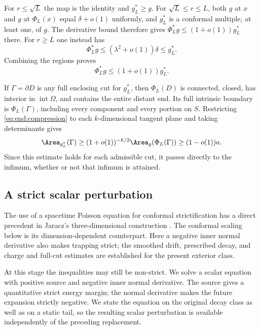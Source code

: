 For $r\le\sqrt L$ the map is the identity and $g_L^*\ge g$.
For $\sqrt L\le r\le L$, both $g$ at $x$ and $g$ at
$\Phi_L(x)$ equal $\delta+o(1)$ uniformly, and $g_L^*$ is
a conformal multiple, at least one, of $g$.
The derivative bound therefore gives
$\Phi_L^*g\le(1+o(1))g_L^*$ there.  For $r\ge L$ one instead
has
\[
 \Phi_L^*g\le(\lambda^2+o(1))\delta\le g_L^*.
\]
Combining the regions proves
\begin{equation}\label{eq:end:compression}
 \Phi_L^*g\le(1+o(1))g_L^*.
\end{equation}

If $\Gamma=\partial D$ is any full enclosing cut for $g_L^*$,
then $\Phi_L(D)$ is connected, closed, has interior in
$\operatorname{int}\Omega$, and contains the entire distant
end.  Its full intrinsic boundary is $\Phi_L(\Gamma)$,
including every component and every portion on $S$.
Restricting \eqref{eq:end:compression} to each
$k$-dimensional tangent plane and taking determinants gives
\begin{equation}\label{eq:end:all-cut-comparison}
 \Area_{g_L^*}(\Gamma)
 \ge(1+o(1))^{-k/2}\Area_g(\Phi_L(\Gamma))
 \ge(1-o(1))a.
\end{equation}
Since this estimate holds for each admissible cut, it passes directly
to the infimum, whether or not that infimum is attained.

\subsection{A strict scalar perturbation}

The use of a spacetime Poisson equation for conformal strictification
has a direct precedent in Jaracz's three-dimensional construction
\cite[Theorem~1.1 and Section~3.1, preprint version~1]{Jaracz2025StrictDEC}.
The conformal scaling below is its dimension-dependent counterpart.
Here a negative inner normal derivative also makes trapping strict;
the smoothed drift, prescribed decay, and charge and full-cut estimates
are established for the present exterior class.

At this stage the inequalities may still be non-strict.  We solve a
scalar equation with positive source and negative inner normal
derivative.  The source gives a quantitative strict energy margin;
the normal derivative makes the future expansion strictly negative.
We state the equation on the original decay class as well as on a
static tail, so the resulting scalar perturbation is available
independently of the preceding replacement.

